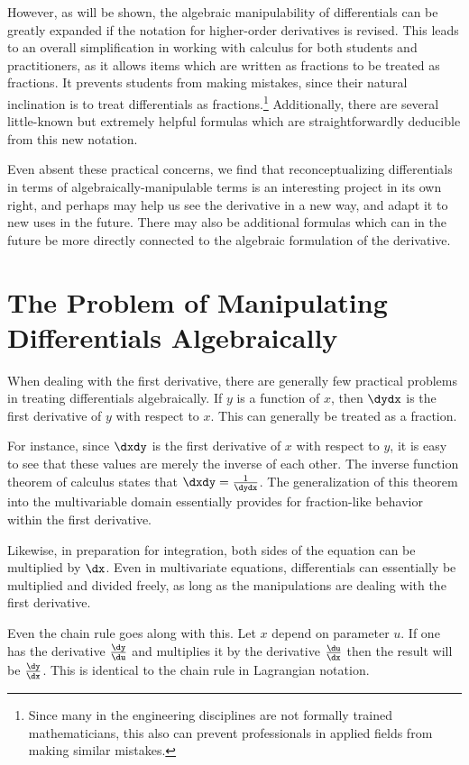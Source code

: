 However, as will be shown, the algebraic manipulability of differentials can be greatly expanded if the notation for higher-order derivatives is revised.
This leads to an overall simplification in working with calculus for both students and practitioners, as it allows items which are written as fractions to be treated as fractions.
It prevents students from making mistakes, since their natural inclination is to treat differentials as fractions.\footnote{Since many in the engineering disciplines are not formally trained mathematicians, this also can prevent professionals in applied fields from making similar mistakes.}
Additionally, there are several little-known but extremely helpful formulas which are straightforwardly deducible from this new notation.

Even absent these practical concerns, we find that reconceptualizing differentials in terms of algebraically-manipulable terms is an interesting project in its own right, and perhaps may help us see the derivative in a new way, and adapt it to new uses in the future.
There may also be additional formulas which can in the future be more directly connected to the algebraic formulation of the derivative.

\section{The Problem of Manipulating Differentials Algebraically}
\label{secproblem}

When dealing with the first derivative, there are generally few practical problems in treating differentials algebraically.
If $y$ is a function of $x$, then $\dydx$ is the first derivative of $y$ with respect to $x$.
This can generally be treated as a fraction.

For instance, since $\dxdy$ is the first derivative of $x$ with respect to $y$, it is easy to see that these values are merely the inverse of each other.
The inverse function theorem of calculus states that $\dxdy = \frac{1}{\dydx}$.
The generalization of this theorem into the multivariable domain essentially provides for fraction-like behavior within the first derivative.

Likewise, in preparation for integration, both sides of the equation can be multiplied by $\dx$.
Even in multivariate equations, differentials can essentially be multiplied and divided freely, as long as the manipulations are dealing with the first derivative.

Even the chain rule goes along with this.
Let $x$ depend on parameter $u$.  If one has the derivative $\frac{\dy}{\du}$ and multiplies it by the derivative $\frac{\du}{\dx}$ then the result will be $\frac{\dy}{\dx}$.
This is identical to the chain rule in Lagrangian notation.

